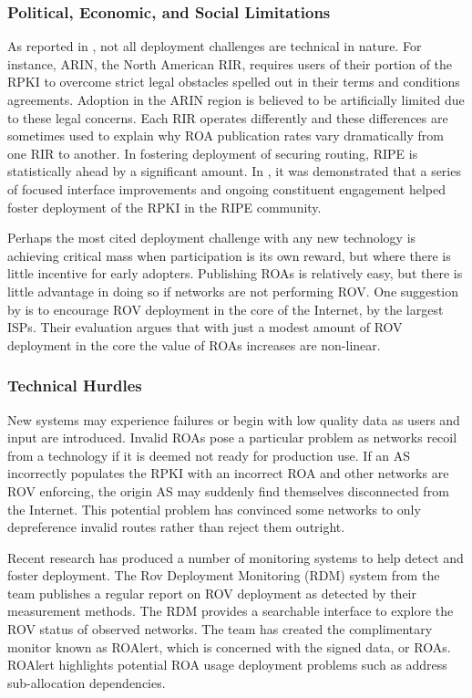 \documentclass[sigconf]{acmart}
\begin{document}
\subsubsection{Political, Economic, and Social Limitations}

As reported in \cite{yoo_lowering_2018}, not all deployment challenges
are technical in nature.  For instance, ARIN, the North American RIR,
requires users of their portion of the RPKI to overcome strict legal
obstacles spelled out in their terms and conditions agreements.
Adoption in the ARIN region is believed to be artificially limited due to
these legal concerns.  Each RIR operates differently and these
differences are sometimes used to explain why ROA publication rates vary
dramatically from one RIR to another.  In fostering deployment of
securing routing, RIPE is statistically ahead by a significant amount.
In \cite{alex_band_ripe_2015}, it was demonstrated that a series of
focused interface improvements and ongoing constituent engagement helped
foster deployment of the RPKI in the RIPE community.

Perhaps the most cited deployment challenge with any new technology is
achieving critical mass when participation is its own reward, but where
there is little incentive for early adopters.  Publishing ROAs is
relatively easy, but there is little advantage in doing so if networks
are not performing ROV.  One suggestion by \cite{gilad_are_2017} is to
encourage ROV deployment in the core of the Internet, by the largest
ISPs.  Their evaluation argues that with just a modest amount of ROV
deployment in the core the value of ROAs increases are non-linear.

\subsubsection{Technical Hurdles}

New systems may experience failures or begin with low quality data as
users and input are introduced.  Invalid ROAs pose a particular problem
as networks recoil from a technology if it is deemed not ready for
production use.  If an AS incorrectly populates the RPKI with an
incorrect ROA and other networks are ROV enforcing, the origin AS may
suddenly find themselves disconnected from the Internet.  This potential
problem has convinced some networks to only depreference invalid routes
rather than reject them outright.

Recent research has produced a number of monitoring systems to help
detect and foster deployment.  The Rov Deployment Monitoring (RDM)
system from the \cite{reuter_towards_2018} team publishes a regular
report on ROV deployment as detected by their measurement methods.  The
RDM provides a searchable interface to explore the ROV status of
observed networks.  The \cite{gilad_are_2017} team has created the
complimentary monitor known as ROAlert, which is concerned with the
signed data, or ROAs.  ROAlert highlights potential ROA usage deployment
problems such as address sub-allocation dependencies.
\end{document}
